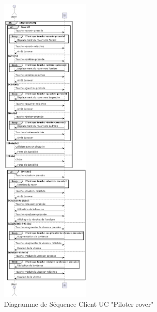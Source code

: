 \documentclass[12pt,a4paper]{scrartcl}
\begin{document}
\begin{figure}[p]
    \centering
    \includegraphics[width=0.4\textwidth]{diag_seq_piloter_rover.png}
    \caption{Diagramme de Séquence Client UC "Piloter rover" }\label{seq2_client}
\end{figure}
\end{document}
